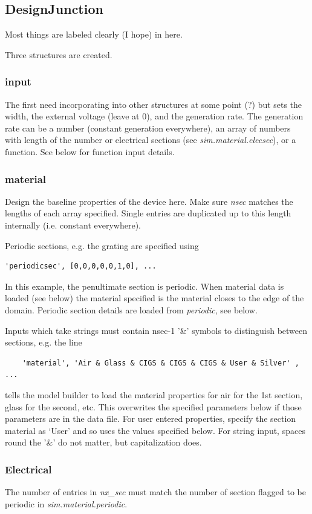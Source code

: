 \documentclass[]{article}  %
\begin{document}
\subsection{DesignJunction}
Most things are labeled clearly (I hope) in here.

Three structures are created. 

\subsubsection{input}
The first need incorporating into other structures at some point (?) but sets the width, the external voltage (leave at 0), and the generation rate. The generation rate can be a number (constant generation everywhere), an array of numbers with length of the number or electrical sections (see \emph{sim.material.elecsec}), or a function. See below for function input details.

\subsubsection{material}
Design the baseline properties of the device here. Make sure \emph{nsec} matches the lengths of each array specified. Single entries are duplicated up to this length internally (i.e. constant everywhere).

Periodic sections, e.g. the grating are specified using 
\begin{verbatim}
'periodicsec', [0,0,0,0,0,1,0], ...
\end{verbatim}
In this example, the penultimate section is periodic. When material data is loaded (see below) the material specified is the material closes to the edge of the domain. Periodic section details are loaded from \emph{periodic}, see below.

Inputs which take strings must contain nsec-1 '\&' symbols to distinguish between sections, e.g. the line
\begin{verbatim}
    'material', 'Air & Glass & CIGS & CIGS & CIGS & User & Silver' , ... 
\end{verbatim}
tells the model builder to load the material properties for air for the 1st section, glass for the second, etc. This overwrites the specified parameters below if those parameters are in the data file. For user entered properties, specify the section material as `User' and so uses the values specified below. For string input, spaces round the '\&' do not matter, but capitalization does.


\subsubsection{Electrical}
The number of entries in \emph{nx\_sec} must match the number of section flagged to be periodic in \emph{sim.material.periodic}.
\end{document}
